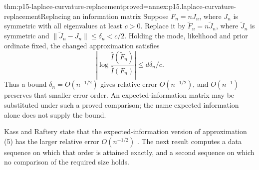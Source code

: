 \begin{hblemma}{thm:p15-laplace-curvature-replacement}{proved=annex:p15.laplace-curvature-replacement}{Replacing an information matrix}
Suppose \(F_n=nJ_n\), where \(J_n\) is symmetric with all eigenvalues
at least \(c>0\).
Replace it by \(\widetilde F_n=n\widetilde J_n\), where
\(\widetilde J_n\) is symmetric and
\(\|\widetilde J_n-J_n\|\leq\delta_n<c/2\). Holding the mode, likelihood
and prior ordinate fixed, the changed approximation satisfies
\[
 \left|\log\frac{\widehat I(\widetilde F_n)}
                         {\widehat I(F_n)}\right|
 \leq d\delta_n/c.
\]
Thus a bound \(\delta_n=O(n^{-1/2})\) gives relative error
\(O(n^{-1/2})\), and \(O(n^{-1})\) preserves that smaller error order.
An expected-information matrix may be substituted under such a proved
comparison; the name expected information alone does not supply the bound.
\end{hblemma}

Kass and Raftery state that the expected-information version of
approximation (5) has the larger relative error \(O(n^{-1/2})\)
\cite[Sec.~4.1.2, p.~778]{KassRaftery1995BayesFactors}. The next result
computes a data sequence on which that order is attained exactly, and a
second sequence on which no comparison of the required size holds.

